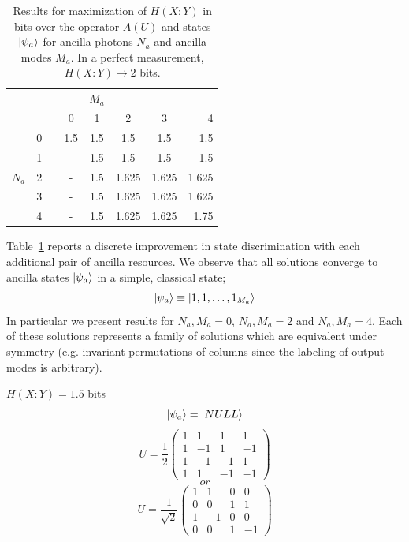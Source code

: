 \documentclass[aps,pra,twocolumn,showpacs,superscriptaddress,floatfix,10pt]{revtex4}
\begin{document}
\begin {table}[H]
\begin{center}
	\begin{tabular}{l*{6}{c}r} 
		& & & &  $M_a$ \\
		&       & \vline   & 0 & 1 & 2 & 3 & 4 \\
		\cline{2-8}
		&	0    & \vline  & 1.5 & 1.5 & 1.5 & 1.5 & 1.5 \\
		&      1    & \vline & - & 1.5 & 1.5 & 1.5 & 1.5 \\
		$N_a$ & 2 & \vline & - & 1.5 & 1.625 & 1.625 & 1.625 \\
		& 3 & \vline & - & 1.5 & 1.625 & 1.625 & 1.625 \\
		& 4 & \vline & - & 1.5 & 1.625 & 1.625 & 1.75 \\
	\end{tabular}
	\caption{Results for maximization of $H(X:Y)$ in bits over the operator $A(U)$ and states $\ket{\psi_a}$ for ancilla photons $N_a$ and ancilla modes $M_a$. In a perfect measurement, $H(X:Y) \rightarrow 2$ bits.\label{Ancilla Resources Table}}
\end{center}
\end{table}
Table~\ref{Ancilla Resources Table} reports a discrete improvement in state discrimination with each additional pair of ancilla resources. We observe that all solutions converge to ancilla states $\ket{\psi_a}$ in a simple, classical state;
\begin{equation}
\ket{\psi_a} \equiv \ket{1,1,\dots,1_{M_a}}
\end{equation} In particular we present results for $N_a,M_a=0$, $N_a,M_a=2$ and $N_a, M_a= 4$. Each of these solutions represents a family of solutions which are equivalent under symmetry (e.g. invariant permutations of columns since the labeling of output modes is arbitrary). 
\newline


		$ H(X:Y) = 1.5 $ bits
		$$ \ket{\psi_a} = \ket{NULL} $$
		\begin{equation}
		\label{No Ancillas}
		U = \frac{1}{2} \begin{pmatrix} 1 & 1 & 1 & 1 \\ 1 & -1 & 1 & -1 \\ 1 & -1 & -1 & 1 \\ 1 & 1 & -1 & -1 \end{pmatrix}   
		\end{equation}
		$$or$$
		\begin{equation}
		U = \frac{1}{\sqrt 2} \begin{pmatrix} 1 & 1 & 0 & 0 \\ 0 & 0 & 1 & 1 \\ 1 & -1 & 0 & 0 \\ 0 & 0 & 1 & -1 \end{pmatrix}   
		\end{equation}
\end{document}
